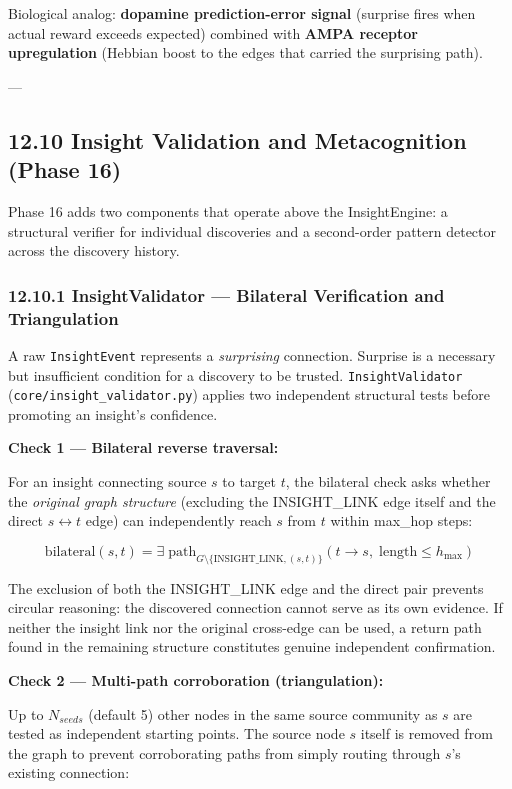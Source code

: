 \documentclass[10pt,journal,compsoc]{IEEEtran}
\begin{document}
Biological analog: \textbf{dopamine prediction-error signal} (surprise fires when actual reward exceeds expected) combined with \textbf{AMPA receptor upreg\-ulation} (Hebbian boost to the edges that carried the surprising path).

---

\subsection{12.10 Insight Validation and Metaco\-gnition (Phase 16)}

Phase 16 adds two components that operate above the InsightEngine: a structural verifier for individual discoveries and a second-order pattern detector across the discovery history.

\subsubsection{12.10.1 InsightValidator — Bilateral Verifi\-cation and Triang\-ulation}

A raw \texttt{InsightEvent} represents a \textit{surprising} connection. Surprise is a necessary but insuf\-ficient condition for a discovery to be trusted. \texttt{InsightValidator} (\texttt{core/insight\_validator.py}) applies two independent structural tests before promoting an insight's confidence.

\textbf{Check 1 — Bilateral reverse traversal:}

For an insight connecting source $s$ to target $t$, the bilateral check asks whether the \textit{original graph structure} (excluding the INSIGHT\_LINK edge itself and the direct $s \leftrightarrow t$ edge) can indep\-endently reach $s$ from $t$ within max\_hop steps:

\begin{equation}
\text{bilateral}(s, t) = \exists\; \text{path}_{G \setminus \{\text{INSIGHT\_LINK}, (s,t)\}}(t \to s,\; \text{length} \leq h_{\max})
\end{equation}

The exclusion of both the INSIGHT\_LINK edge and the direct pair prevents circular reasoning: the discovered connection cannot serve as its own evidence. If neither the insight link nor the original cross-edge can be used, a return path found in the remaining structure constitutes genuine independent confi\-rmation.

\textbf{Check 2 — Multi-path corro\-boration (trian\-gulation):}

Up to $N_{seeds}$ (default 5) other nodes in the same source community as $s$ are tested as independent starting points. The source node $s$ itself is removed from the graph to prevent corro\-borating paths from simply routing through $s$'s existing connection:
\end{document}
